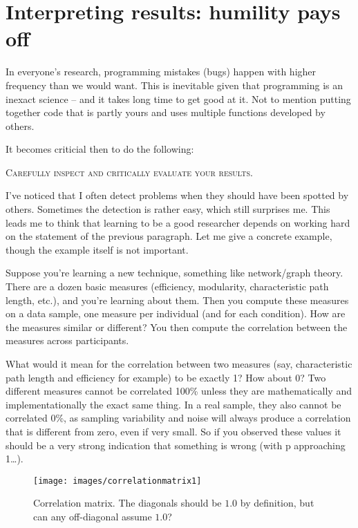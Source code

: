 \documentclass[]{article}
\title{}
\author{}
\date{}
\begin{document}
\section{Interpreting results: humility pays
off}\label{interpreting-results-humility-pays-off}

In everyone's research, programming mistakes (bugs) happen with higher
frequency than we would want. This is inevitable given that programming
is an inexact science -- and it takes long time to get good at it. Not
to mention putting together code that is partly yours and uses multiple
functions developed by others.

It becomes criticial then to do the following:

\textsc{Carefully inspect and critically evaluate your results.}

I've noticed that I often detect problems when they should have been
spotted by others. Sometimes the detection is rather easy, which still
surprises me. This leads me to think that learning to be a good
researcher depends on working hard on the statement of the previous
paragraph. Let me give a concrete example, though the example itself is
not important.

Suppose you're learning a new technique, something like network/graph
theory. There are a dozen basic measures (efficiency, modularity,
characteristic path length, etc.), and you're learning about them. Then
you compute these measures on a data sample, one measure per individual
(and for each condition). How are the measures similar or different? You
then compute the correlation between the measures across participants.

What would it mean for the correlation between two measures (say,
characteristic path length and efficiency for example) to be exactly 1?
How about 0? Two different measures cannot be correlated 100\% unless
they are mathematically and implementationally the exact same thing. In
a real sample, they also cannot be correlated 0\%, as sampling
variability and noise will always produce a correlation that is
different from zero, even if very small. So if you observed these values
it should be a very strong indication that something is wrong (with p
approaching 1\ldots{}).

\begin{figure}
\texttt{[image: images/correlationmatrix1]} \caption{Correlation matrix. The diagonals should be $1.0$ by definition, but can any off-diagonal assume $1.0$?}\label{fig:unnamed-chunk-1}
\end{figure}
\end{document}
